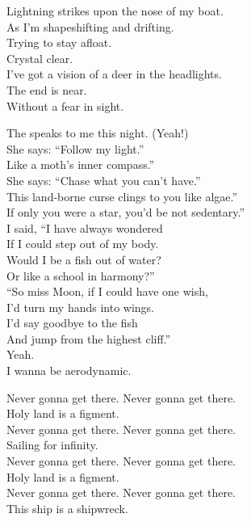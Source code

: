 Lightning strikes upon the nose of my boat. \\
As I'm shapeshifting and drifting. \\
Trying to stay afloat. \\
Crystal clear. \\
I've got a vision of a deer in the headlights. \\
The end is near. \\
Without a fear in sight. \\


The  speaks to me this night. (Yeah!) \\
She says: ``Follow my light.'' \\
Like a moth's inner compass.'' \\
She says: ``Chase what you can't have.'' \\
This land-borne curse clings to you like algae.'' \\
If only you were a star, you'd be not sedentary.'' \\

I said, ``I have always wondered \\
If I could step out of my body. \\
Would I be a fish out of water? \\
Or like a school in harmony?'' \\
``So miss Moon, if I could have one wish, \\
I'd turn my hands into wings. \\
I'd say goodbye to the fish \\
And jump from the highest cliff.'' \\
Yeah. \\

I wanna be aerodynamic. \\


Never gonna get there. Never gonna get there. \\
Holy land is a figment. \\
Never gonna get there. Never gonna get there. \\
Sailing for infinity. \\
Never gonna get there. Never gonna get there. \\
Holy land is a figment. \\
Never gonna get there. Never gonna get there. \\
This ship is a shipwreck. \\

